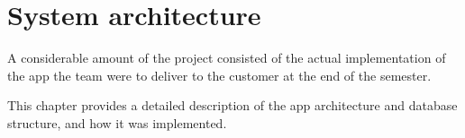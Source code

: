 \chapter{System architecture}

A considerable amount of the project consisted of the actual implementation of the app the team were to deliver to the customer at the end of the semester. 

This chapter provides a detailed description of the app architecture and database structure, and how it was implemented.



